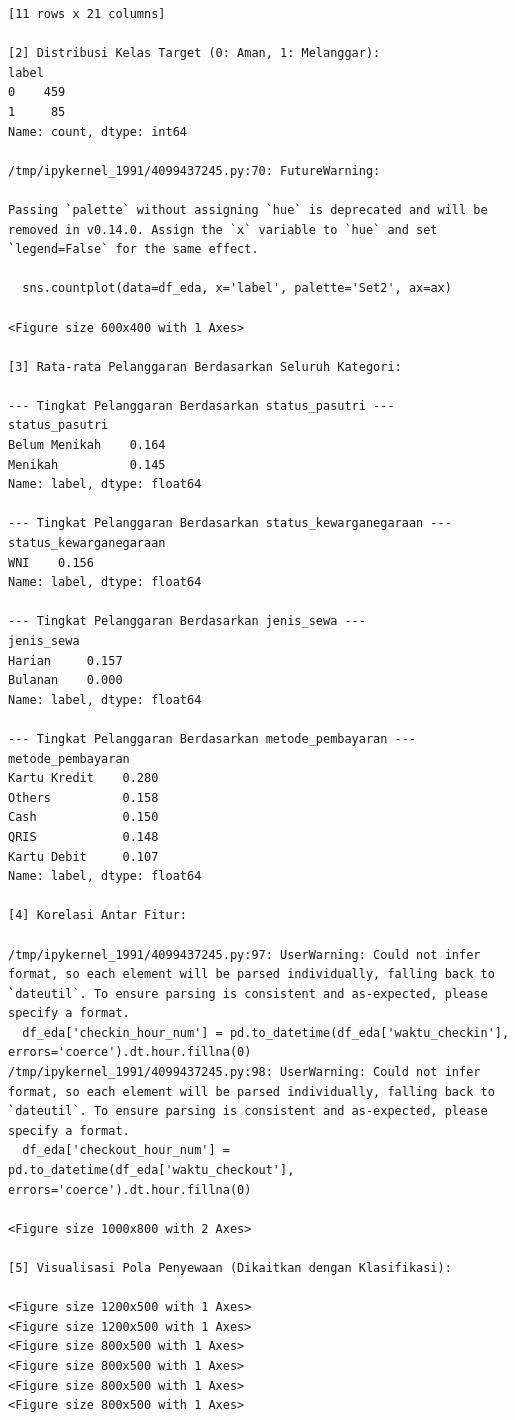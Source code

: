 \begin{lstlisting}[caption={Output 14}]
[11 rows x 21 columns]

[2] Distribusi Kelas Target (0: Aman, 1: Melanggar):
label
0    459
1     85
Name: count, dtype: int64

/tmp/ipykernel_1991/4099437245.py:70: FutureWarning: 

Passing `palette` without assigning `hue` is deprecated and will be removed in v0.14.0. Assign the `x` variable to `hue` and set `legend=False` for the same effect.

  sns.countplot(data=df_eda, x='label', palette='Set2', ax=ax)

<Figure size 600x400 with 1 Axes>

[3] Rata-rata Pelanggaran Berdasarkan Seluruh Kategori:

--- Tingkat Pelanggaran Berdasarkan status_pasutri ---
status_pasutri
Belum Menikah    0.164
Menikah          0.145
Name: label, dtype: float64

--- Tingkat Pelanggaran Berdasarkan status_kewarganegaraan ---
status_kewarganegaraan
WNI    0.156
Name: label, dtype: float64

--- Tingkat Pelanggaran Berdasarkan jenis_sewa ---
jenis_sewa
Harian     0.157
Bulanan    0.000
Name: label, dtype: float64

--- Tingkat Pelanggaran Berdasarkan metode_pembayaran ---
metode_pembayaran
Kartu Kredit    0.280
Others          0.158
Cash            0.150
QRIS            0.148
Kartu Debit     0.107
Name: label, dtype: float64

[4] Korelasi Antar Fitur:

/tmp/ipykernel_1991/4099437245.py:97: UserWarning: Could not infer format, so each element will be parsed individually, falling back to `dateutil`. To ensure parsing is consistent and as-expected, please specify a format.
  df_eda['checkin_hour_num'] = pd.to_datetime(df_eda['waktu_checkin'], errors='coerce').dt.hour.fillna(0)
/tmp/ipykernel_1991/4099437245.py:98: UserWarning: Could not infer format, so each element will be parsed individually, falling back to `dateutil`. To ensure parsing is consistent and as-expected, please specify a format.
  df_eda['checkout_hour_num'] = pd.to_datetime(df_eda['waktu_checkout'], errors='coerce').dt.hour.fillna(0)

<Figure size 1000x800 with 2 Axes>

[5] Visualisasi Pola Penyewaan (Dikaitkan dengan Klasifikasi):

<Figure size 1200x500 with 1 Axes>
<Figure size 1200x500 with 1 Axes>
<Figure size 800x500 with 1 Axes>
<Figure size 800x500 with 1 Axes>
<Figure size 800x500 with 1 Axes>
<Figure size 800x500 with 1 Axes>


\end{lstlisting}
